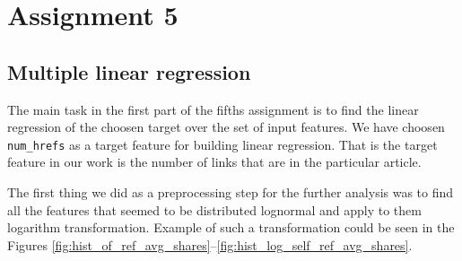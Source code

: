\section{Assignment 5}
\subsection{Multiple linear regression}
The main task in the first part of the fifths assignment is to find the linear regression of the choosen target over the set of input features.
We have choosen \texttt{num\_hrefs} as a target feature for building linear regression. That is the target feature  in our work is the  number of links that are in the particular article. 

The first thing we did as a preprocessing step for the further analysis was to find all the features that seemed to be distributed lognormal and apply to them logarithm transformation.
Example of such a transformation could be seen in the Figures \ref{fig:hist_of_ref_avg_shares}--\ref{fig:hist_log_self_ref_avg_shares}.
 
